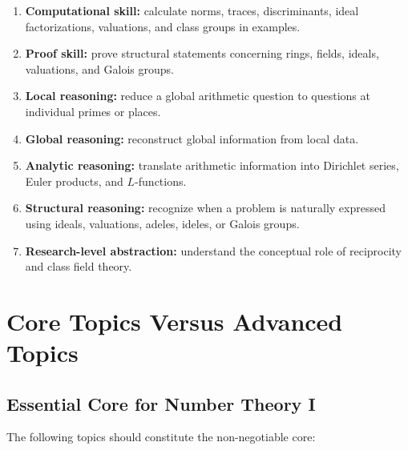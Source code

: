 \documentclass[11pt,a4paper]{article}
\begin{document}
\begin{enumerate}
    \item \textbf{Computational skill:}
    calculate norms, traces, discriminants, ideal factorizations,
    valuations, and class groups in examples.

    \item \textbf{Proof skill:}
    prove structural statements concerning rings, fields, ideals,
    valuations, and Galois groups.

    \item \textbf{Local reasoning:}
    reduce a global arithmetic question to questions at individual
    primes or places.

    \item \textbf{Global reasoning:}
    reconstruct global information from local data.

    \item \textbf{Analytic reasoning:}
    translate arithmetic information into Dirichlet series,
    Euler products, and \(L\)-functions.

    \item \textbf{Structural reasoning:}
    recognize when a problem is naturally expressed using ideals,
    valuations, adeles, ideles, or Galois groups.

    \item \textbf{Research-level abstraction:}
    understand the conceptual role of reciprocity and class
    field theory.
\end{enumerate}

\section{Core Topics Versus Advanced Topics}

\subsection{Essential Core for Number Theory I}

The following topics should constitute the non-negotiable core:
\end{document}
